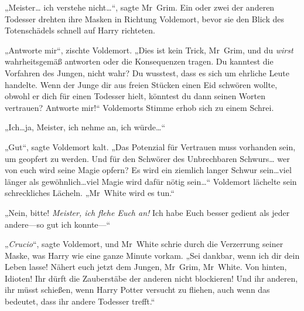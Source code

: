„Meister… ich verstehe nicht…“, sagte Mr~Grim.
Ein oder zwei der anderen Todesser drehten ihre Masken in Richtung Voldemort, bevor sie den Blick des Totenschädels schnell auf Harry richteten.

„Antworte mir“, zischte Voldemort. „Dies ist kein Trick, Mr~Grim, und du \emph{wirst} wahrheitsgemäß antworten oder die Konsequenzen tragen. Du kanntest die Vorfahren des Jungen, nicht wahr? Du wusstest, dass es sich um ehrliche Leute handelte. Wenn der Junge dir aus freien Stücken einen Eid schwören wollte, obwohl er dich für einen Todesser hielt, könntest du dann seinen Worten vertrauen? Antworte mir!“
Voldemorts Stimme erhob sich zu einem Schrei.

„Ich…ja, Meister, ich nehme an, ich würde…“

„Gut“, sagte Voldemort kalt. „Das Potenzial für Vertrauen muss vorhanden sein, um geopfert zu werden. Und für den Schwörer des Unbrechbaren Schwurs… wer von euch wird seine Magie opfern? Es wird ein ziemlich langer Schwur sein…viel länger als gewöhnlich…viel Magie wird dafür nötig sein…“
Voldemort lächelte sein schreckliches Lächeln. „Mr~White wird es tun.“

„Nein, bitte! \emph{Meister, ich flehe Euch an!} Ich habe Euch besser gedient als jeder andere—so gut ich konnte—“

„\emph{Crucio}“, sagte Voldemort, und Mr~White schrie durch die Verzerrung seiner Maske, was Harry wie eine ganze Minute vorkam. „Sei dankbar, wenn ich dir dein Leben lasse! Nähert euch jetzt dem Jungen, Mr~Grim, Mr~White. Von hinten, Idioten! Ihr dürft die Zauberstäbe der anderen nicht blockieren! Und ihr anderen, ihr müsst schießen, wenn Harry Potter versucht zu fliehen, auch wenn das bedeutet, dass ihr andere Todesser trefft.“

